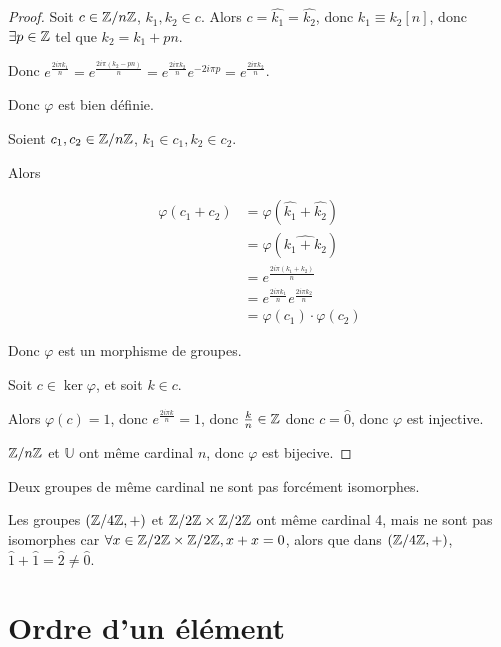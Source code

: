 \begin{proof}
    Soit $c \in \mathbb{Z} /n \mathbb{Z}$, $k_1, k_2 \in c$. Alors $c = \hat{k_1} = \hat{k_2}$, donc
    $k_1 \equiv k_2 [n]$, donc $\exists p \in \mathbb{Z}$ tel que $k_2 = k_1 + pn$.

    Donc $\displaystyle e^{\frac{2i\pi k_1}n} = e^{\frac{2i\pi (k_2 - pn)} n} = e^{\frac{2i\pi k_2} n} e^{-2i\pi p} = e^{\frac{2i\pi k_2} n}$.

    Donc $\varphi$ est bien définie.

    \svspace Soient $c_1, c_2 \in \mathbb{Z}/n\mathbb{Z}$, $k_1 \in c_1, k_2 \in c_2$.

    Alors

     $$\begin{aligned}
        \varphi(c_1 + c_2) & = \varphi(\hat{k_1} + \hat{k_2}) \\
        & = \varphi(\widehat{k_1 + k_2}) \\
        & = e^{\frac{2i\pi (k_1 + k_2)} n} \\
        & = e^{\frac{2i\pi k_1} n} e^{\frac{2i\pi k_2} n} \\
        & = \varphi(c_1) \cdot \varphi(c_2)
    \end{aligned}$$

    Donc $\varphi$ est un morphisme de groupes.

    Soit $c \in \ker \varphi$, et soit $k \in c$.

    Alors $\varphi(c) = 1$, donc $e^{\frac{2i\pi k} n} = 1$, donc $\frac k n \in \mathbb{Z}$ donc 
    $c = \hat 0$, donc $\varphi$ est injective.

    \avspace $\mathbb{Z} / n \mathbb{Z}$ et $\mathbb U$ ont même cardinal $n$, donc $\varphi$ est bijecive.
\end{proof}


\begin{remarque}
    Deux groupes de même cardinal ne sont pas forcément isomorphes.
\end{remarque}

\begin{exemple}
    Les groupes $(\mathbb{Z}/4\mathbb{Z}, +)$ et $\mathbb{Z} / 2\mathbb{Z} \times \mathbb{Z} / 2\mathbb{Z}$ ont même cardinal 4,
    mais ne sont pas isomorphes car $\forall x \in \mathbb{Z} / 2\mathbb{Z} \times \mathbb{Z} / 2\mathbb{Z}, x + x = 0$,
    alors que dans $(\mathbb{Z}/4\mathbb{Z}, +)$, $\hat 1 + \hat 1 = \hat 2 \neq \hat 0$.
\end{exemple}

\section{Ordre d'un élément}

